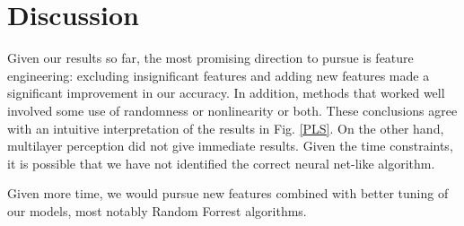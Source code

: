 \documentclass[11pt]{article}
\begin{document}
\section{Discussion}
Given our results so far, the most promising direction to pursue is feature engineering: excluding insignificant features and adding new features made a significant improvement in our accuracy. In addition, methods that worked well involved some use of randomness or nonlinearity or both. These conclusions agree with an intuitive interpretation of the results in Fig. \ref{PLS}. On the other hand, multilayer perception did not give immediate results. Given the time constraints, it is possible that we have not identified the correct neural net-like algorithm.

Given more time, we would pursue new features combined with better tuning of our models, most notably Random Forrest algorithms.
\end{document}
